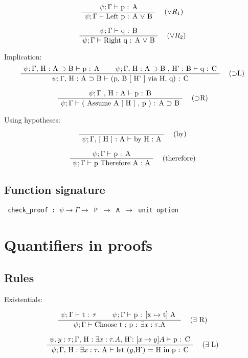 \documentclass[twoside,a4paper]{article}
\theoremstyle{definition}
\begin{document}
\[
\AxiomC{$\psi ; \Gamma \vdash$ p : A}
\RightLabel{\quad ($\vee R_1$)}
\UnaryInfC{$\psi ; \Gamma \vdash$ Left p : A $\vee$ B}
\DisplayProof
\]

\[
\AxiomC{$\psi ; \Gamma \vdash$ q : B}
\RightLabel{\quad ($\vee R_2$)}
\UnaryInfC{$\psi ; \Gamma \vdash$ Right q :  A $\vee$ B}
\DisplayProof
\]

Implication:
\[
\AxiomC{$\psi ; \Gamma ,$ H : A $\supset$ B $\vdash$ p : A}
\AxiomC{$\psi ; \Gamma ,$ H : A $\supset$ B , H' : B $\vdash$ q : C}
\RightLabel{\quad ($\supset$L)}
\BinaryInfC{$\psi ; \Gamma ,$ H : A $\supset$ B $\vdash$
(p, B [ H' ] via H, q) : C}
\DisplayProof
\]

\[
\AxiomC{$\psi ; \Gamma$ , H : A $\vdash$ p : B}
\RightLabel{\quad ($\supset$R)}
\UnaryInfC{$\psi ; \Gamma \vdash$ ( Assume A [ H ] , p ) : A
$\supset$ B}
\DisplayProof
\]

Using hypotheses:

\[
\AxiomC{}
\RightLabel{\quad (by)}
\UnaryInfC{$\psi ; \Gamma , $ [ H ] : A $\vdash$ by H : A}
\DisplayProof
\]

\[
\AxiomC{$\psi ; \Gamma \vdash$ p : A}
\RightLabel{\quad (therefore)}
\UnaryInfC{$\psi ; \Gamma \vdash$ p Therefore A : A}
\DisplayProof
\]

\subsection{Function signature}
\begin{center}
{\tt
check_proof : $\psi \rightarrow \Gamma \rightarrow $ P
$\rightarrow$ A $\rightarrow$ unit option
}
\end{center}

\section{Quantifiers in proofs}

\subsection{Rules}
Existentials:

\[
\AxiomC{$\psi ; \Gamma \vdash$ t : $\tau$}
\AxiomC{$\psi ; \Gamma \vdash$ p : [x $\mapsto$ t] A }
\RightLabel{\quad ($\exists$ R)}
\BinaryInfC{$\psi ; \Gamma \vdash$ Choose t ; p : $\exists x : \tau . $A}
\DisplayProof
\]

\[
\AxiomC{$\psi, y:\tau ; \Gamma, $ H $:\exists x : \tau . A, $ H': $[x \mapsto y] A \vdash$ p : C}
\RightLabel{\quad ($\exists$ L)}
\UnaryInfC{$\psi ; \Gamma , $ H $:\exists x:\tau. $ A $ \vdash$
let ($y$,H') = H in p : C}
\DisplayProof
\]
\end{document}
